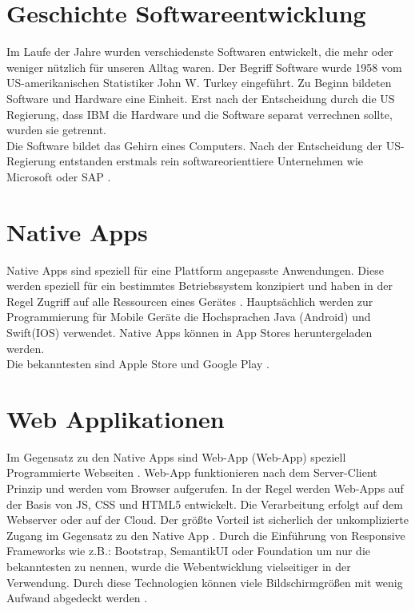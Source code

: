 \section{Geschichte Softwareentwicklung}
Im Laufe der Jahre wurden verschiedenste Softwaren entwickelt, die mehr oder weniger nützlich für unseren Alltag waren.
Der Begriff Software wurde 1958 vom US-amerikanischen Statistiker John W. Turkey eingeführt.
Zu Beginn bildeten Software und Hardware eine Einheit. Erst nach der Entscheidung durch die US Regierung, dass IBM die Hardware und die Software separat verrechnen sollte, wurden sie getrennt. \\
Die Software bildet das Gehirn eines Computers.
Nach der Entscheidung der US-Regierung entstanden erstmals rein softwareorienttiere Unternehmen wie Microsoft oder SAP \cite{Microsoft} \cite{SAP}. 

\section{Native Apps}\label{chap:Native Apps}
Native Apps sind speziell für eine Plattform angepasste Anwendungen. 
Diese werden speziell für ein bestimmtes Betriebssystem konzipiert und haben in der Regel Zugriff auf alle Ressourcen eines Gerätes \cite{NativeApp}.
Hauptsächlich werden zur Programmierung für Mobile Geräte die Hochsprachen Java (Android) und Swift(IOS) verwendet. Native Apps können in App Stores heruntergeladen  werden. \\Die bekanntesten sind Apple Store und Google Play \cite{Hochsprachen}.

\section{Web Applikationen}\label{chap:Webapplikationen}
Im Gegensatz zu den Native Apps sind \acl{Web-App} (\acs{Web-App}) speziell Programmierte Webseiten \cite{Hochsprachen}.
\acs{Web-App} funktionieren nach dem Server-Client Prinzip und werden vom Browser aufgerufen. In der Regel werden \acs{Web-App}s auf der Basis von \acs{JS}, \acs{CSS} und \acs{HTML}5 entwickelt. Die Verarbeitung erfolgt auf dem Webserver oder auf der Cloud. 
Der größte Vorteil ist sicherlich der unkomplizierte Zugang im Gegensatz zu den Native App \cite{WebApps}.
Durch die Einführung von Responsive Frameworks wie z.B.: Bootstrap, SemantikUI oder Foundation um nur die bekanntesten zu nennen, wurde die Webentwicklung vielseitiger in der Verwendung. Durch diese Technologien können viele Bildschirmgrößen mit wenig Aufwand abgedeckt werden \cite{CSS}. 

